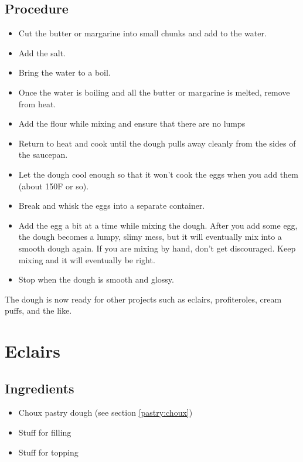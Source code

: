 \documentclass[10pt, openany]{book}
\begin{document}
\subsection{Procedure}
\begin{itemize}
  \item Cut the butter or margarine into small chunks and add to the water.
  \item Add the salt.
  \item Bring the water to a boil.
  \item Once the water is boiling and all the butter or margarine is melted, remove from heat.
  \item Add the flour while mixing and ensure that there are no lumps
  \item Return to heat and cook until the dough pulls away cleanly from the sides of the saucepan.
  \item Let the dough cool enough so that it won't cook the eggs when you add them (about 150\degree{}F or so).
  \item Break and whisk the eggs into a separate container.
  \item Add the egg a bit at a time while mixing the dough.  After you add some egg, the dough becomes a lumpy, slimy mess, but it will eventually mix into a smooth dough again.  If you are mixing by hand, don't get discouraged.  Keep mixing and it will eventually be right.
  \item Stop when the dough is smooth and glossy.
\end{itemize}
The dough is now ready for other projects such as eclairs, profiteroles, cream puffs, and the like.

\section{Eclairs}
\label{pastry:Eclair}
\subsection{Ingredients}
\begin{itemize}
  \item Choux pastry dough (see section \ref{pastry:choux})
  \item Stuff for filling
  \item Stuff for topping
\end{itemize}
\end{document}
